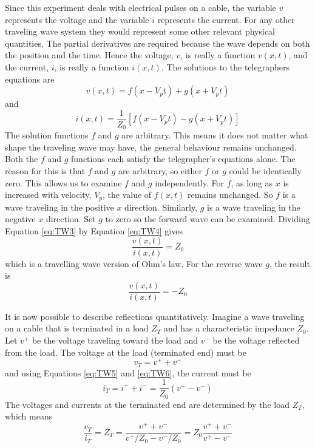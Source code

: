 \documentclass[12pt, a4paper, oneside, openright, titlepage]{book}
\begin{document}
\noindent Since this experiment deals with electrical pulses on a cable, the variable $v$ represents the voltage and the variable $i$ represents the current. For any other traveling wave system they would represent some other relevant physical quantities. The partial derivatives are required because the wave depends on both the position and the time. Hence the voltage, $v$, is really a function $v(x, t)$, and the current, $i$, is really a function $i(x, t)$. The solutions to the telegraphers equations are \begin{equation}\label{eq:TW3}
    v(x,t) = f(x-V_pt) + g(x+V_pt)
\end{equation}
and \begin{equation}\label{eq:TW4}
    i(x,t) = \frac{1}{Z_0}\left[f(x-V_pt) - g(x+V_pt)\right]
\end{equation}
The solution functions $f$ and $g$ are arbitrary. This means it does not matter what shape the traveling wave may have, the general behaviour remains unchanged. Both the $f$ and $g$ functions each satisfy the telegrapher’s equations alone. The reason for this is that $f$ and $g$ are arbitrary, so either $f$ or $g$ could be identically zero. This allows us to examine $f$ and $g$ independently. For $f$, as long as $x$ is increased with velocity, $V_p$, the value of $f(x, t)$ remains unchanged. So $f$ is a wave traveling in the positive $x$ direction. Similarly, $g$ is a wave traveling in the negative $x$ direction. Set $g$ to zero so the forward wave can be examined. Dividing Equation \ref{eq:TW3} by Equation \ref{eq:TW4} gives  \begin{equation}\label{eq:TW5} 
    \frac{v(x,t)}{i(x,t)} = Z_0
\end{equation}
which is a travelling wave version of Ohm's law. For the reverse wave $g$, the result is \begin{equation}\label{eq:TW6}
    \frac{v(x,t)}{i(x,t)} = -Z_0
\end{equation}

\noindent It is now possible to describe reflections quantitatively. Imagine a wave traveling on a cable that is terminated in a load $Z_T$ and has a characteristic impedance $Z_0$. Let $v^+$ be the voltage traveling toward the load and $v^-$ be the voltage reflected from the load. The voltage at the load (terminated end) must be \begin{equation}\label{eq:TW7}
    v_T = v^+ + v^-
\end{equation}
and using Equations \ref{eq:TW5} and \ref{eq:TW6}, the current must be \begin{equation}\label{eq:TW8}
    i_T = i^+ + i^- = \frac{1}{Z_0}(v^+-v^-)
\end{equation}
The voltages and currents at the terminated end are determined by the load $Z_T$, which means \begin{equation}\label{eq:TW9}
    \frac{v_T}{i_T} = Z_T = \frac{v^++v^-}{v^+/Z_0 - v^-/Z_0} = Z_0 \frac{v^+ + v^-}{v^+-v^-}
\end{equation}
\end{document}
